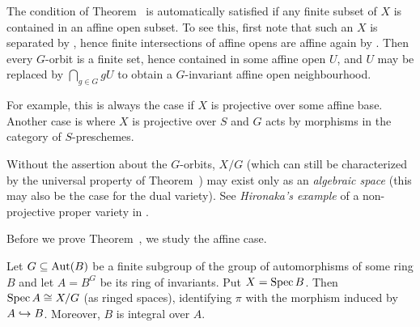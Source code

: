 \documentclass[a4paper,parskip=half,numbers=enddot, DIV=12]{scrreprt}
\begin{document}
\begin{rem}
	\begin{alphanumerate}
		\item The condition of Theorem~ is automatically satisfied if any finite subset of $X$ is contained in an affine open subset. To see this, first note that such an $X$ is separated by \cite[Fact~1.5.5]{alggeo1}, hence finite intersections of affine opens are affine again by \cite[Proposition~1.5.4]{alggeo1}. Then every $G$-orbit is a finite set, hence contained in some affine open $U$, and $U$ may be replaced by $\bigcap_{g\in G}gU$ to obtain a $G$-invariant affine open neighbourhood.
		
		For example, this is always the case if $X$ is projective over some affine base. Another case is where $X$ is projective over $S$ and $G$ acts by morphisms in the category of $S$-preschemes.
		\item Without the assertion about the $G$-orbits, $X/G$ (which can still be characterized by the universal property of Theorem~) may exist only as an \emph{algebraic space} (this may also be the case for the dual variety). See \emph{Hironaka's example} of  a non-projective proper variety in \cite{hartshorne}.
	\end{alphanumerate}
\end{rem}
Before we prove Theorem~, we study the affine case.
\begin{lem}
	Let $G\subseteq \operatorname{Aut}(B)$ be a finite subgroup of the group of automorphisms of some ring $B$ and let $A=B^G$ be its ring of invariants. Put $X=\operatorname{Spec} B$. Then $\operatorname{Spec} A\cong X/G$ (as ringed spaces), identifying $\pi$ with the morphism induced by $A\monomorphism B$. Moreover, $B$ is integral over $A$.
\end{lem}
\end{document}
